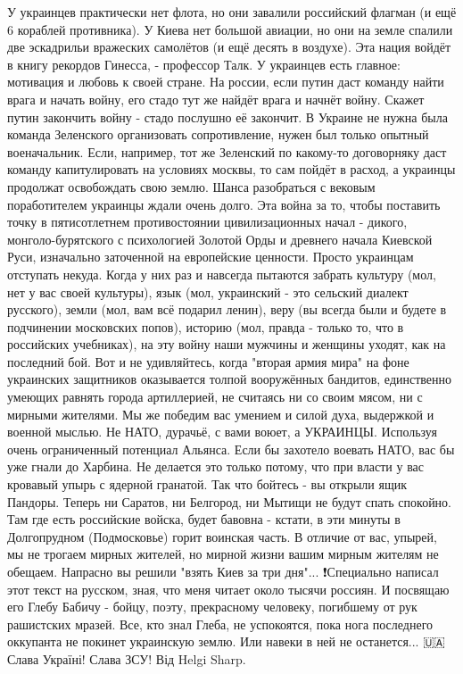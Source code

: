У украинцев практически нет флота, но они завалили российский флагман (и ещё 6 кораблей противника). У Киева нет большой авиации, но они на земле спалили две эскадрильи вражеских самолётов (и ещё десять в воздухе). Эта нация войдёт в книгу рекордов Гинесса, - профессор Талк.
У украинцев есть главное: мотивация и любовь к своей стране.
На россии, если путин даст команду найти врага и начать войну, его стадо тут же найдёт врага и начнёт войну. Скажет путин закончить войну - стадо послушно её закончит.
В Украине не нужна была команда Зеленского организовать сопротивление, нужен был только опытный военачальник. Если, например, тот же Зеленский по какому-то договорняку даст команду капитулировать на условиях москвы, то сам пойдёт в расход, а украинцы продолжат освобождать свою землю.
Шанса разобраться с вековым поработителем украинцы ждали очень долго. Эта война за то, чтобы поставить точку в пятисотлетнем противостоянии цивилизационных начал - дикого, монголо-бурятского с психологией Золотой Орды и древнего начала Киевской Руси, изначально заточенной на европейские ценности.
Просто украинцам отступать некуда. Когда у них раз и навсегда пытаются забрать культуру (мол, нет у вас своей культуры), язык (мол, украинский - это сельский диалект русского), земли (мол, вам всё подарил ленин), веру (вы всегда были и будете в подчинении московских попов), историю (мол, правда - только то, что в российских учебниках), на эту войну наши мужчины и женщины уходят, как на последний бой.
Вот и не удивляйтесь, когда "вторая армия мира" на фоне украинских защитников оказывается толпой вооружённых бандитов, единственно умеющих равнять города артиллерией, не считаясь ни со своим мясом, ни с мирными жителями.
Мы же победим вас умением и силой духа, выдержкой и военной мыслью. Не НАТО, дурачьё, с вами воюет, а УКРАИНЦЫ. Используя очень ограниченный потенциал Альянса. Если бы захотело воевать НАТО, вас бы уже гнали до Харбина. Не делается это только потому, что при власти у вас кровавый упырь с ядерной гранатой.
Так что бойтесь - вы открыли ящик Пандоры. Теперь ни Саратов, ни Белгород, ни Мытищи не будут спать спокойно. Там где есть российские войска, будет бавовна - кстати, в эти минуты в Долгопрудном (Подмосковье) горит воинская часть. В отличие от вас, упырей, мы не трогаем мирных жителей, но мирной жизни вашим мирным жителям не обещаем. Напрасно вы решили "взять Киев за три дня"...
❗️Специально написал этот текст на русском, зная, что меня читает около тысячи россиян. И посвящаю его Глебу Бабичу - бойцу, поэту, прекрасному человеку, погибшему от рук рашистских мразей. Все, кто знал Глеба, не успокоятся, пока нога последнего оккупанта не покинет украинскую землю. Или навеки в ней не останется...
🇺🇦 Слава Україні! Слава ЗСУ!
Від Helgi Sharp.


